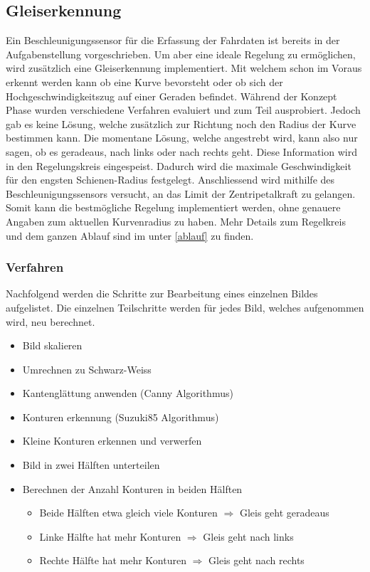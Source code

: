 \documentclass[../../main.tex]{subfiles}
\begin{document}
\subsection{Gleiserkennung}
Ein Beschleunigungssensor für die Erfassung der Fahrdaten ist bereits in der Aufgabenstellung vorgeschrieben.
Um aber eine ideale Regelung zu ermöglichen, wird zusätzlich eine Gleiserkennung implementiert. Mit welchem schon im Voraus
erkennt werden kann ob eine Kurve bevorsteht oder ob sich der Hochgeschwindigkeitszug auf einer Geraden befindet.
Während der Konzept Phase wurden verschiedene Verfahren evaluiert und zum Teil ausprobiert. Jedoch gab es keine Lösung, welche zusätzlich zur Richtung noch den Radius
der Kurve bestimmen kann. Die momentane Lösung, welche angestrebt wird, kann also nur sagen, ob es geradeaus, nach links oder nach rechts geht.
Diese Information wird in den Regelungskreis eingespeist. Dadurch wird die maximale Geschwindigkeit für den engsten Schienen-Radius festgelegt. Anschliessend wird mithilfe des Beschleunigungssensors versucht, an das Limit der Zentripetalkraft zu gelangen. Somit kann die
bestmögliche Regelung implementiert werden, ohne genauere Angaben zum aktuellen Kurvenradius zu haben.
Mehr Details zum Regelkreis und dem ganzen Ablauf sind im unter \ref{ablauf} zu finden.

\subsubsection{Verfahren}
Nachfolgend werden die Schritte zur Bearbeitung eines einzelnen Bildes aufgelistet.
Die einzelnen Teilschritte werden für jedes Bild, welches aufgenommen wird, neu berechnet.
\begin{itemize} %
    \item Bild skalieren
    \item Umrechnen zu Schwarz-Weiss
    \item Kantenglättung anwenden (Canny Algorithmus)
    \item Konturen erkennung (Suzuki85 Algorithmus)
    \item Kleine Konturen erkennen und verwerfen
    \item Bild in zwei Hälften unterteilen
    \item Berechnen der Anzahl Konturen in beiden Hälften
        \begin{itemize}
            \item Beide Hälften etwa gleich viele Konturen $\Rightarrow$ Gleis geht geradeaus
            \item Linke Hälfte hat mehr Konturen $\Rightarrow$ Gleis geht nach links
            \item Rechte Hälfte hat mehr Konturen $\Rightarrow$ Gleis geht nach rechts
        \end{itemize}
\end{itemize}
\end{document}
